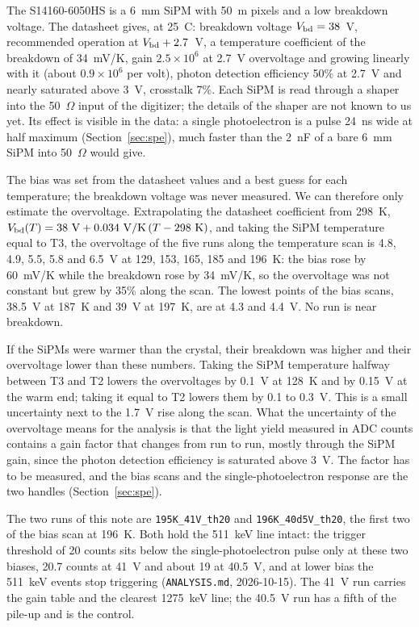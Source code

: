 \documentclass[11pt]{article}
\newcommand{\code}[1]{\texttt{#1}}
\begin{document}
The S14160-6050HS is a 6~mm SiPM with 50~\textmu m pixels and a low breakdown
voltage. The datasheet gives, at 25~\textdegree C: breakdown voltage
$V_{\rm bd} = 38$~V, recommended operation at $V_{\rm bd} + 2.7$~V, a
temperature coefficient of the breakdown of 34~mV/K, gain $2.5 \times 10^6$
at 2.7~V overvoltage and growing linearly with it (about $0.9 \times 10^6$
per volt), photon detection efficiency 50\% at 2.7~V and nearly saturated
above 3~V, crosstalk 7\%. Each SiPM is read through a shaper into the
50~$\Omega$ input of the digitizer; the details of the shaper are not
known to us yet. Its effect is visible in the data: a single
photoelectron is a pulse 24~ns wide at half maximum (Section~\ref{sec:spe}),
much faster than the 2~nF of a bare 6~mm SiPM into 50~$\Omega$ would give.

The bias was set from the datasheet values and a best guess for each
temperature; the breakdown voltage was never measured. We can therefore
only estimate the overvoltage. Extrapolating the datasheet coefficient from
298~K, $V_{\rm bd}(T) = 38~\mathrm{V} + 0.034~\mathrm{V/K}\,(T - 298~\mathrm{K})$,
and taking the SiPM temperature equal to T3, the overvoltage of the five
runs along the temperature scan is 4.8, 4.9, 5.5, 5.8 and 6.5~V at 129,
153, 165, 185 and 196~K: the bias rose by 60~mV/K while the breakdown rose
by 34~mV/K, so the overvoltage was not constant but grew by 35\% along the
scan. The lowest points of the bias scans, 38.5~V at 187~K and 39~V at
197~K, are at 4.3 and 4.4~V. No run is near breakdown.

If the SiPMs were warmer than the crystal, their breakdown was higher and
their overvoltage lower than these numbers. Taking the SiPM temperature
halfway between T3 and T2 lowers the overvoltages by 0.1~V at 128~K and by
0.15~V at the warm end; taking it equal to T2 lowers them by 0.1 to 0.3~V.
This is a small uncertainty next to the 1.7~V rise along the scan. What
the uncertainty of the overvoltage means for the analysis is that the
light yield measured in ADC counts contains a gain factor that changes
from run to run, mostly through the SiPM gain, since the photon detection
efficiency is saturated above 3~V. The factor has to be measured, and the
bias scans and the single-photoelectron response are the two handles
(Section~\ref{sec:spe}).

The two runs of this note are \code{195K\_41V\_th20} and
\code{196K\_40d5V\_th20}, the first two of the bias scan at 196~K. Both
hold the 511~keV line intact: the trigger threshold of 20 counts sits
below the single-photoelectron pulse only at these two biases, 20.7
counts at 41~V and about 19 at 40.5~V, and at lower bias the 511~keV
events stop triggering (\code{ANALYSIS.md}, 2026-10-15). The 41~V run
carries the gain table and the clearest 1275~keV line; the 40.5~V run
has a fifth of the pile-up and is the control.
\end{document}

